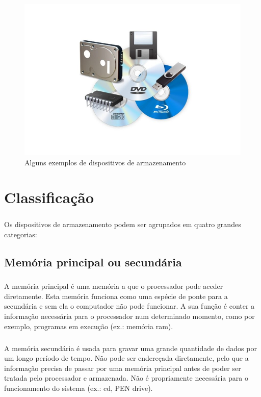 \documentclass[a4paper]{report}
\begin{document}
\begin{figure}[H]
\center
\includegraphics[width=13cm]{Imagens/zolpm4P.jpg}
\caption{Alguns exemplos de dispositivos de armazenamento}
\end{figure}

\chapter{Classificação}
\label{chap.classificacao}

\paragraph*{}Os dispositivos de armazenamento podem ser agrupados em quatro grandes categorias:

\section{Memória principal ou secundária}
\label{sect.memoriaprinsec}

\paragraph*{}A memória principal é uma memória a que o processador pode aceder diretamente. Esta memória funciona como uma espécie de ponte para a secundária e sem ela o computador não pode funcionar. A sua função é conter a informação necessária para o processador num determinado momento, como por exemplo, programas em execução (ex.: memória \ac{ram}).

\paragraph*{}A memória secundária é usada para gravar uma grande quantidade de dados por um longo período de tempo. Não pode ser endereçada diretamente, pelo que a informação precisa de passar por uma memória principal antes de poder ser tratada pelo processador e armazenada. Não é propriamente necessária para o funcionamento do sistema (ex.: \ac{cd}, PEN drive).
\end{document}
